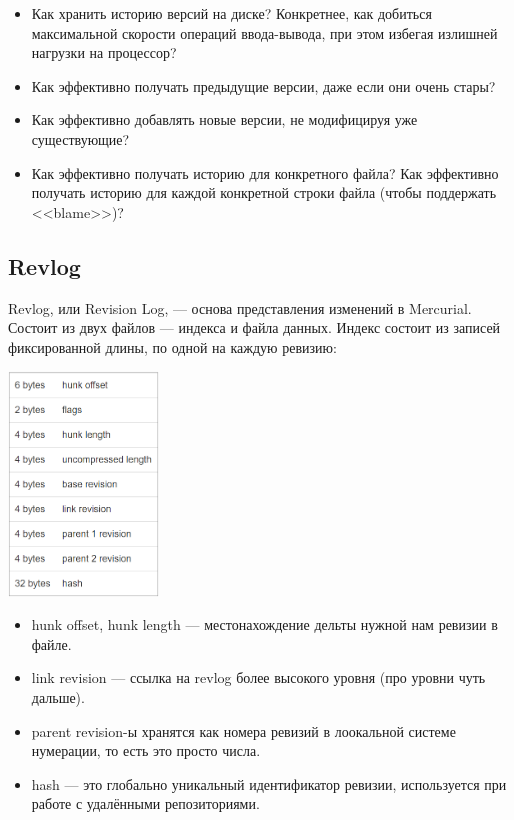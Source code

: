 \documentclass[a5paper]{article}
\begin{document}
\begin{itemize}
	\item Как хранить историю версий на диске? Конкретнее, как добиться максимальной скорости операций ввода-вывода, при этом избегая излишней нагрузки на процессор?
	\item Как эффективно получать предыдущие версии, даже если они очень стары?
	\item Как эффективно добавлять новые версии, не модифицируя уже существующие?
	\item Как эффективно получать историю для конкретного файла? Как эффективно получать историю для каждой конкретной строки файла (чтобы поддержать <<blame>>)?
\end{itemize}

\subsection{Revlog}

Revlog, или Revision Log, --- основа представления изменений в Mercurial. Состоит из двух файлов --- индекса и файла данных. Индекс состоит из записей фиксированной длины, по одной на каждую ревизию:

\begin{center}
	\includegraphics[width=0.3\textwidth]{revlog.png}
\end{center}

\begin{itemize}
	\item hunk offset, hunk length --- местонахождение дельты нужной нам ревизии в файле. 
	\item link revision --- ссылка на revlog более высокого уровня (про уровни чуть дальше).
	\item parent revision-ы хранятся как номера ревизий в лоокальной системе нумерации, то есть это просто числа.
	\item hash --- это глобально уникальный идентификатор ревизии, используется при работе с удалёнными репозиториями.
\end{itemize}
\end{document}
